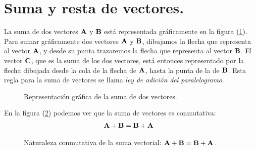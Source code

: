 \section{Suma y resta de vectores.}

La suma de dos vectores $\vb{A}$ y $\vb{B}$ está representada gráficamente en la figura (\ref{fig:figura_01_02}). Para sumar gráficamente dos vectores $\vb{A}$ y $\vb{B}$, dibujamos la flecha que representa al vector $\vb{A}$, y desde su punta trazaremos la flecha que representa al vector $\vb{B}$. El vector $\vb{C}$, que es la suma de los dos vectores, está entonces representado por la flecha dibujada desde la cola de la flecha de $\vb{A}$, hasta la punta de la de $\vb{B}$. Esta regla para la suma de vectores se llama \emph{ley de adición del paralelogramo}.
\begin{figure}[H]
    \centering
    \caption{Representación gráfica de la suma de dos vectores.}
    \label{fig:figura_01_02}
\end{figure}
En la figura (\ref{fig:figura_01_03}) podemos ver que la suma de vectores es conmutativa:
\begin{align*}
    \vb{A} + \vb{B} = \vb{B} + \vb{A}
\end{align*}
\begin{figure}[H]
    \centering
    \caption{Naturaleza conmutativa de la suma vectorial: $\vb{A} + \vb{B} = \vb{B} + \vb{A}$.}
    \label{fig:figura_01_03}
\end{figure}
